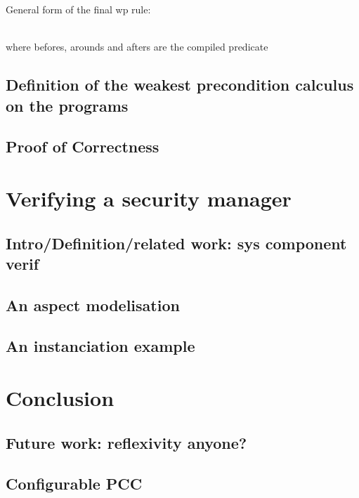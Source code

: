 \documentclass[draft]{llncs}
\begin{document}
General form of the final wp rule:
\bcode

\\
\ecode
where befores, arounds and afters are the compiled predicate
\subsection{Definition of the weakest precondition calculus on the programs}
\subsection{Proof of Correctness}
%
\section{Verifying a security manager}
\subsection{Intro/Definition/related work: sys component verif}
\subsection{An aspect modelisation}
\subsection{An instanciation example}
\section{Conclusion}
\subsection{Future work: reflexivity anyone?}
\subsection{Configurable PCC}
%
%




%
\end{document}
